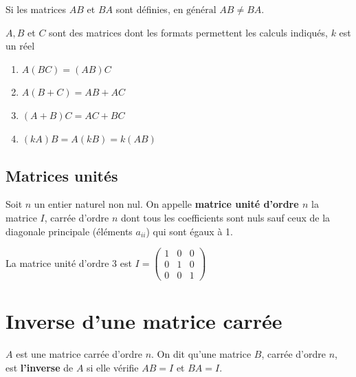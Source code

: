 \documentclass[french]{book}
\begin{document}
\begin{rem}

 
  Si les matrices $AB$ et $BA$ sont définies, $\boxed{ \text{en général } AB\neq BA}$.
  \end{rem}
  
  
\begin{prop}

   $A,B$ et $C$ sont des matrices dont les formats permettent les calculs indiqués, $k$ est un réel
  
  \begin{enumerate}
  \item $A(BC)=(AB)C$
  
  \item $A(B+C)=AB+AC$
  
  \item $(A+B)C=AC+BC$
  
  \item $(kA)B=A(kB)=k(AB)$
\end{enumerate}   

\end{prop}

\subsection{Matrices unités}
\begin{defn}
Soit $n$ un entier naturel non nul. On appelle \textbf{matrice unité d'ordre $n$} la matrice $I$, carrée d'ordre $n$ dont tous les coefficients sont nuls sauf ceux de la diagonale principale (éléments $a_{ii}$) qui sont égaux à 1.
\end{defn}

\begin{exemple}

La matrice unité d'ordre 3 est $I=\begin{pmatrix}
    1 & 0 & 0 \\ 
   0 & 1 & 0 \\
   0 & 0 & 1
   \end{pmatrix} $
  
\end{exemple}

   \section{Inverse d'une matrice carrée}
  
   \begin{defn}
   $A$ est une matrice carrée d'ordre $n$. On dit qu'une matrice $B$, carrée d'ordre $n$, est \textbf{l'inverse} de $A$ si elle vérifie $AB=I$ et $BA=I$.
	\end{defn}   
   
\end{document}
